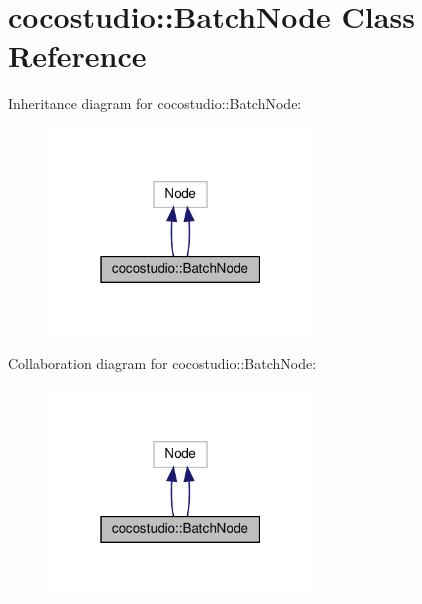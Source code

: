 \hypertarget{classcocostudio_1_1BatchNode}{}\section{cocostudio\+:\+:Batch\+Node Class Reference}
\label{classcocostudio_1_1BatchNode}


Inheritance diagram for cocostudio\+:\+:Batch\+Node\+:
\nopagebreak
\begin{figure}[H]
\begin{center}
\leavevmode
\includegraphics[width=199pt]{classcocostudio_1_1BatchNode__inherit__graph}
\end{center}
\end{figure}


Collaboration diagram for cocostudio\+:\+:Batch\+Node\+:
\nopagebreak
\begin{figure}[H]
\begin{center}
\leavevmode
\includegraphics[width=199pt]{classcocostudio_1_1BatchNode__coll__graph}
\end{center}
\end{figure}
